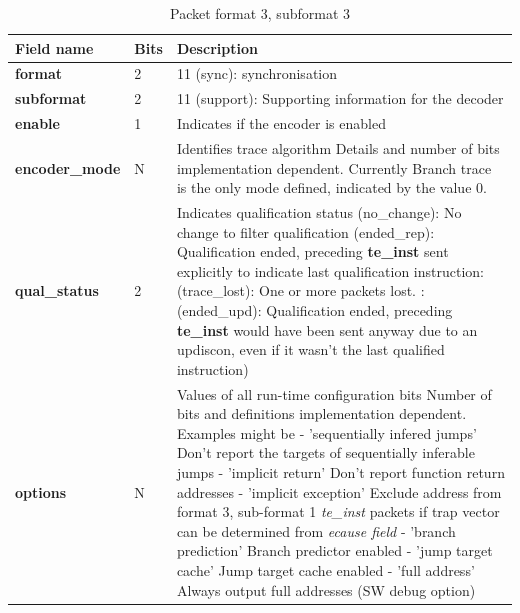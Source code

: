 \begin{table}[htp]
  \centering
  \caption{Packet format 3, subformat 3}
  \label{tab:te_inst3}
  \begin{tabulary}{\textwidth}{|l|p{35mm}|p{90mm}|}
    \hline
     {\bf Field name} & {\bf Bits} & {\bf Description} \\
     \hline
     \textbf{format} & 2 & 11 (sync): synchronisation\\
     \hline
     \textbf{subformat}  & 2 & 11 (support): Supporting information for the decoder \\
     \hline
     \textbf{enable} & 1 & Indicates if the encoder is enabled\\
     \hline
     \textbf{encoder\_mode} & N & Identifies trace algorithm\newline
       Details and number of bits implementation dependent.  Currently Branch trace is the only mode defined, indicated by the value 0.\\
     \hline
     \textbf{qual\_status} & 2 & Indicates qualification status (no\_change): No change to filter qualification  (ended\_rep): Qualification ended, preceding \textbf{te\_inst} sent explicitly to indicate last qualification instruction: (trace\_lost): One or more packets lost. : (ended\_upd): Qualification ended, preceding \textbf{te\_inst} would have been sent anyway due to an updiscon, even if it wasn't the last qualified instruction)\\
     \hline
     \textbf{options} & N & Values of all run-time configuration bits\newline
       Number of bits and definitions implementation dependent.  Examples might be\newline
       - 'sequentially infered jumps' Don't report the targets of sequentially inferable jumps\newline
       - 'implicit return' Don't report function return addresses \newline
       - 'implicit exception' Exclude address from format 3, sub-format 1 \textit{te\_inst} packets if trap vector can be determined from \textit{ecause field}\newline
       - 'branch prediction' Branch predictor enabled\newline
       - 'jump target cache' Jump target cache enabled\newline
       - 'full address' Always output full addresses (SW debug option)\\
       \hline
  \end{tabulary}
\end{table}

